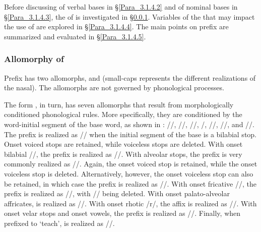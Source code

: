 Before discussing  of verbal bases in §\ref{Para_3.1.4.2} and of nominal bases in §\ref{Para_3.1.4.3}, the  of  is investigated in §\ref{Para_3.1.4.1}. Variables of the  that may impact the use of  are explored in §\ref{Para_3.1.4.4}. The main points on prefix  are summarized and evaluated in §\ref{Para_3.1.4.5}.


\subsubsection[Allomorphy of pe(n)-]{Allomorphy of }\label{Para_3.1.4.1}

Prefix  has two allomorphs, \textitbf{)}\textitbf{-} and \textitbf{)}\textitbf{-} (small-caps  represents the different realizations of the nasal). The allomorphs are not governed by phonological processes.



The form \textitbf{)}\textitbf{-}, in turn, has seven allomorphs that result from morphologically conditioned phonological rules. More specifically, they are conditioned by the word-initial segment of the base word, as shown in : //, //, //, /, //, //, and //. The prefix is realized as // when the initial segment of the base is a bilabial stop. Onset voiced stops are retained, while voiceless stops are deleted. With onset bilabial //, the prefix is realized as //. With alveolar stops, the prefix is very commonly realized as //. Again, the onset voiced stop is retained, while the onset voiceless stop is deleted. Alternatively, however, the onset voiceless stop can also be retained, in which case the prefix is realized as //. With onset fricative //, the prefix is realized as //, with // being deleted. With onset palato-alveolar affricates, \textitbf{)}\textitbf{-} is realized as //. With onset rhotic /r/, the affix is realized as //. With onset velar stops and onset vowels, the prefix is realized as //. Finally, when prefixed to  ‘teach’, \textitbf{)}\textitbf{-} is realized as //.

